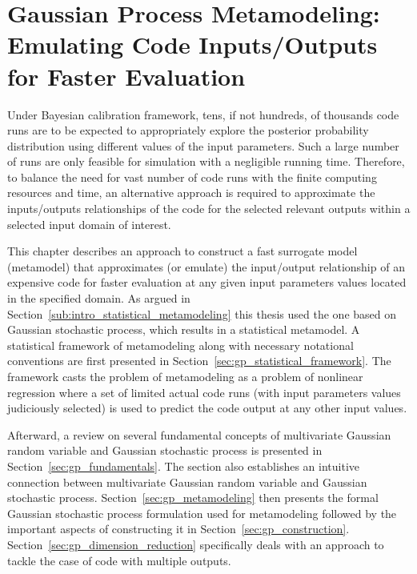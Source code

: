 \chapter[Gaussian Process Metamodeling]{Gaussian Process Metamodeling: Emulating Code Inputs/Outputs for Faster Evaluation}\label{ch:gp_metamodel}

Under Bayesian calibration framework, tens, if not hundreds, of thousands code runs are to be expected to appropriately explore the posterior probability distribution using different values of the input parameters.
Such a large number of runs are only feasible for simulation with a negligible running time.
Therefore, to balance the need for vast number of code runs with the finite computing resources and time, 
an alternative approach is required to approximate the inputs/outputs relationships of the code for the selected relevant outputs within a selected input domain of interest. 

This chapter describes an approach to construct a fast surrogate model (metamodel) that approximates (or emulate) the input/output relationship of an expensive code for faster evaluation at any given input parameters values located in the specified domain.
As argued in Section~\ref{sub:intro_statistical_metamodeling} this thesis used the one based on Gaussian stochastic process, which results in a statistical metamodel. 
A statistical framework of metamodeling along with necessary notational conventions are first presented in Section~\ref{sec:gp_statistical_framework}.
The framework casts the problem of metamodeling as a problem of nonlinear regression where a set of limited actual code runs (with input parameters values judiciously selected) is used to predict the code output at any other input values.

Afterward, a review on several fundamental concepts of multivariate Gaussian random variable and Gaussian stochastic process is presented in Section~\ref{sec:gp_fundamentals}.
The section also establishes an intuitive connection between multivariate Gaussian random variable and Gaussian stochastic process.
Section~\ref{sec:gp_metamodeling} then presents the formal Gaussian stochastic process formulation used for metamodeling followed by the important aspects of constructing it in Section~\ref{sec:gp_construction}.
Section~\ref{sec:gp_dimension_reduction} specifically deals with an approach to tackle the case of code with multiple outputs.


